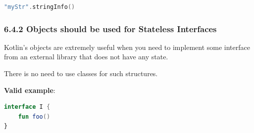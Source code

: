 {{{{{{{{\begin{lstlisting}[language=Kotlin]
"myStr".stringInfo()
\end{lstlisting}


\subsubsection*{\textbf{6.4.2 Objects should be used for Stateless Interfaces}}
\leavevmode\newline

\label{sec:6.4.2}

Kotlin’s objects are extremely useful when you need to implement some interface from an external library that does not have any state.

There is no need to use classes for such structures.



\textbf{Valid example}:

\begin{lstlisting}[language=Kotlin]
interface I {
    fun foo()
}


\end{lstlisting}}}}}}}}}
